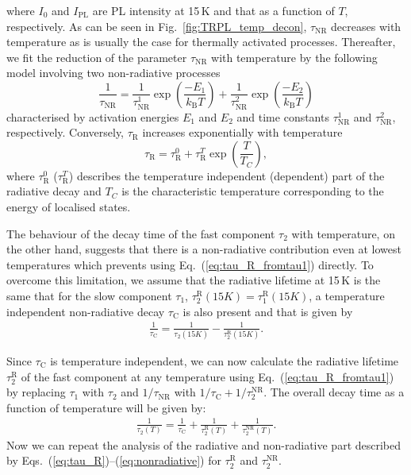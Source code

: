 \noindent where $I_0$ and $I_\mathrm{PL}$ are PL intensity at 15$\,$K and that as a function of $T$, respectively. As can be seen in Fig.~\ref{fig:TRPL_temp_decon}, $\tau_\mathrm{NR}$ decreases with temperature as is usually the case for thermally activated processes. Thereafter, we fit the reduction of the parameter $\tau_\mathrm{NR}$ with temperature by the following model involving two non-radiative processes 
%
\begin{equation}
\frac{1}{\tau_\mathrm{NR}}=\frac{1}{\tau_\mathrm{NR}^1}\exp{\left(\frac{-E_1}{k_\mathrm{B}T}\right)} + \frac{1}{\tau_\mathrm{NR}^2}\exp{\left(\frac{-E_2}{k_\mathrm{B}T}\right)} \label{eq:nonradiative}
\end{equation}
%
characterised by activation energies $E_1$ and $E_2$ and time constants $\tau_\mathrm{NR}^1$ and $\tau_\mathrm{NR}^2$, respectively.
Conversely, $\tau_\mathrm{R}$ increases exponentially with temperature
%
\begin{equation}
\tau_\mathrm{R} = \tau_\mathrm{R}^0 + \tau_\mathrm{R}^T \exp{\left(\frac{T}{T_C}\right)}, \label{eq:tau_R} 
\end{equation}
%
where $ \tau_\mathrm{R}^0$ ($ \tau_\mathrm{R}^T$) describes the temperature independent (dependent) part of the radiative decay and $T_C$ is the characteristic temperature corresponding to the energy of localised states. 

The behaviour of the decay time of the fast component $\tau_2$ with temperature, on the other hand, suggests that there is a non-radiative contribution even at lowest temperatures which prevents using Eq.~(\ref{eq:tau_R_fromtau1}) directly. To overcome this limitation, we assume that the radiative lifetime at 15$\,$K is the same that for the slow component $\tau_1$, $\tau_2^\mathrm{R}(15K)=\tau_1^\mathrm{R}(15K)$, a temperature independent non-radiative decay $\tau_\mathrm{C}$ is also present and that is given by
%
\begin{eqnarray}
\frac{1}{\tau_\mathrm{C}}=\frac{1}{\tau_2(15K)}-\frac{1}{\tau_2^\mathrm{R}(15K)}.\label{eq:tau_C}
\end{eqnarray}

Since $\tau_\mathrm{C}$ is temperature independent, we can now calculate the radiative lifetime $\tau_2^\mathrm{R}$ of the fast component at any temperature using Eq.~(\ref{eq:tau_R_fromtau1}) by replacing $\tau_1$ with $\tau_2$ and $1/\tau_\mathrm{NR}$ with $1/\tau_\mathrm{C}+1/\tau_2^\mathrm{NR}$. The overall decay time as a function of temperature will be given by:
\begin{eqnarray}
\frac{1}{\tau_2(T)}=\frac{1}{\tau_\mathrm{C}}+\frac{1}{\tau_2^\mathrm{R}(T)}+\frac{1}{\tau_2^\mathrm{NR}(T)}.
\end{eqnarray}
%
Now we can repeat the analysis of the radiative and non-radiative part described by Eqs.~(\ref{eq:tau_R})--(\ref{eq:nonradiative}) for $\tau_2^\mathrm{R}$ and $\tau_2^\mathrm{NR}$.

